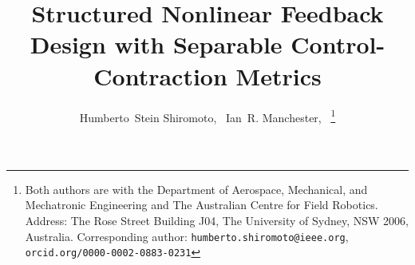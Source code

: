 \documentclass[10pt,twocolumn,twoside]{IEEEtran}
\theoremstyle{plain}
\theoremstyle{definition}
\theoremstyle{remark}
\begin{document}
%
\title{Structured Nonlinear Feedback Design with Separable Control-Contraction Metrics}
%
%
%

\author{Humberto~Stein Shiromoto,~
        Ian~R. Manchester,~%
\thanks{Both authors are with the Department of Aerospace, Mechanical, and Mechatronic Engineering and The Australian Centre for Field Robotics. Address: The
Rose Street Building J04, The University of Sydney, NSW 2006, Australia. Corresponding author: {\tt humberto.shiromoto@ieee.org}, {\tt orcid.org/0000-0002-0883-0231}}%
}

% 
%



% 
\end{document}
